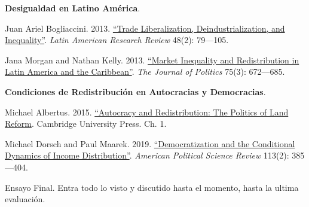 \documentclass[letterpaper]{article}
\renewenvironment{itemize}{
  \begin{list}{}{
    \setlength{\leftmargin}{1.5em}
  }
}{
  \end{list}
}
\begin{document}
\begin{enumerate}[label=\roman*.]
\begin{itemize}
			\item[20.] {\bf Desigualdad en Latino Am\'erica}.
				\begin{itemize}
					\item[$\circ$] Juan Ariel Bogliaccini. 2013. \href{https://github.com/hbahamonde/Ciencia_Politica_II/raw/master/Readings/Bogliaccini.pdf}{``Trade Liberalization, Deindustrialization, and Inequality''}. \emph{Latin American Research Review} 48(2): 79---105.
					\item[$\circ$] Jana Morgan and Nathan Kelly. 2013. \href{https://github.com/hbahamonde/Ciencia_Politica_II/raw/master/Readings/Morgan_Kelly.pdf}{``Market Inequality and Redistribution in Latin America and the Caribbean''}. \emph{The Journal of Politics} 75(3): 672---685.
				\end{itemize}


			\item[21.] {\bf Condiciones de Redistribuci\'on en Autocracias y Democracias}.
				\begin{itemize}
					\item[$\circ$] Michael Albertus. 2015. \href{https://github.com/hbahamonde/Ciencia_Politica_II/raw/master/Readings/Albertus_2013.pdf}{``Autocracy and Redistribution: The Politics of Land Reform}. Cambridge University Press. Ch. 1.
					\item[$\circ$] Michael Dorsch and Paul Maarek. 2019. \href{https://github.com/hbahamonde/Ciencia_Politica_II/raw/master/Readings/Dorsch_2019.pdf}{``Democratization and the Conditional Dynamics of Income Distribution''}. \emph{American Political Science Review} 113(2): 385---404.
				\end{itemize}


		\end{itemize}

\item[{\color{red}\Pointinghand}] Ensayo Final. Entra todo lo visto y discutido hasta el momento, hasta la ultima evaluaci\'on.

\end{enumerate}


	


















\newpage
{}
\setcounter{page}{1}
\printbibliography
\end{document}
